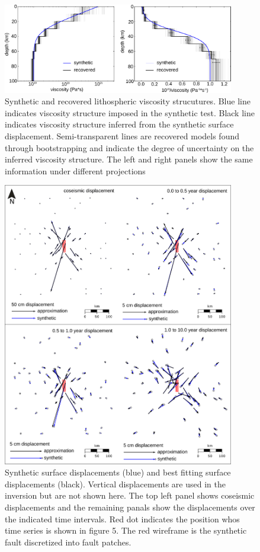 \documentclass[extra]{gji}
\begin{document}
\begin{figure}[h!]\label{figure3}
  \centering
  \includegraphics[width=0.9\textwidth]{FinalFigures/Figure3.pdf}
  \caption{Synthetic and recovered lithospheric viscosity strucutures.
    Blue line indicates viscosity structure imposed in the synthetic
    test. Black line indicates viscosity structure inferred from the
    synthetic surface displacement.  Semi-transparent lines are
    recovered models found through bootstrapping and indicate the
    degree of uncertainty on the inferred viscosity structure.  The
    left and right panels show the same information under
    different projections}
  \label{figure 3}
\end{figure}

\begin{figure}[h!]\label{figure4}
  \centering
  \includegraphics[width=0.9\textwidth]{FinalFigures/Figure4.pdf}
  \caption{Synthetic surface displacements (blue) and best fitting
    surface displacements (black).  Vertical displacements are used in
    the inversion but are not shown here.  The top left panel shows
    coseismic displacements and the remaining panals show the
    displacements over the indicated time intervals. Red dot indicates
    the position whos time series is shown in figure 5. The red wireframe
    is the synthetic fault discretized into fault patches.}
  \label{figure 4}
\end{figure}
\end{document}

